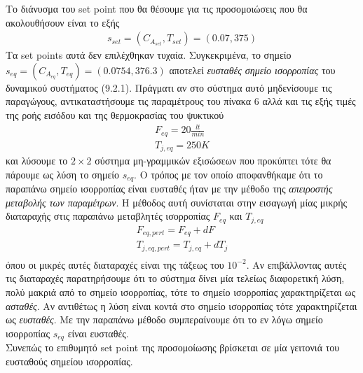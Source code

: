 \documentclass[11pt]{article} %
\numberwithin{equation}{subsection}
\begin{document}
Το διάνυσμα του set point που θα θέσουμε για τις προσομοιώσεις που θα ακολουθήσουν είναι το εξής
\begin{align*}
s_{set} = (C_{A_{set}}, T_{set}) = (0.07, 375)
\end{align*}
Τα set points αυτά δεν επιλέχθηκαν τυχαία. Συγκεκριμένα, το σημείο $s_{eq} = (C_{A_{eq}}, T_{eq}) = (0.0754, 376.3)$ αποτελεί \textit{ευσταθές σημείο ισορροπίας} του δυναμικού συστήματος (9.2.1). Πράγματι αν στο σύστημα αυτό μηδενίσουμε τις παραγώγους, αντικαταστήσουμε τις παραμέτρους του πίνακα 6 αλλά και τις εξής τιμές της ροής εισόδου και της θερμοκρασίας του ψυκτικού
\begin{align*}
F_{eq} = 20 \frac{lt}{min}\\
T_{j, eq} = 250 K
\end{align*}
και λύσουμε το $2 \times 2$ σύστημα μη-γραμμικών εξισώσεων που προκύπτει τότε θα πάρουμε ως λύση το σημείο $s_{eq}$. Ο τρόπος με τον οποίο αποφανθήκαμε ότι το παραπάνω σημείο ισορροπίας είναι ευσταθές ήταν με την μέθοδο της  \textit{απειροστής μεταβολής των παραμέτρων}.  Η μέθοδος αυτή συνίσταται στην εισαγωγή μίας μικρής διαταραχής στις παραπάνω μεταβλητές ισορροπίας $F_{eq}$ και $T_{j, eq}$
\begin{align*}
F_{eq, pert} = F_{eq} + dF\\
T_{j,eq,pert} = T_{j, eq} + dT_{j}\\
\end{align*}
όπου οι μικρές αυτές διαταραχές είναι της τάξεως του $10^{-2}$. Αν επιβάλλοντας αυτές τις διαταραχές παρατηρήσουμε ότι το σύστημα δίνει μία τελείως διαφορετική λύση, πολύ μακριά από το σημείο ισορροπίας, τότε το σημείο ισορροπίας χαρακτηρίζεται ως \textit{ασταθές}. Αν αντιθέτως η λύση είναι κοντά στο σημείο ισορροπίας τότε χαρακτηρίζεται ως \textit{ευσταθές}. Με την παραπάνω μέθοδο συμπεραίνουμε ότι το εν λόγω σημείο ισορροπίας $s_{eq}$ είναι ευσταθές.\\

Συνεπώς το επιθυμητό set point της προσομοίωσης βρίσκεται σε μία γειτονιά του ευσταθούς σημείου ισορροπίας. \\
\end{document}
